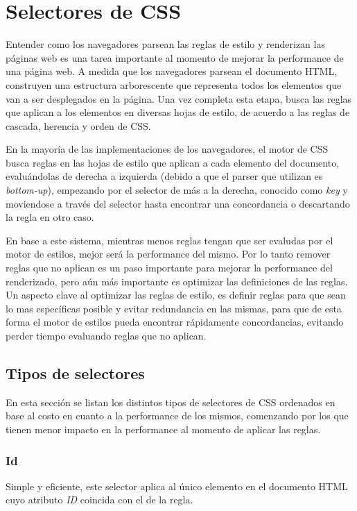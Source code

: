 
\chapter{Selectores de CSS}
Entender como los navegadores parsean las reglas de estilo y renderizan las páginas web es una tarea importante al momento de mejorar la performance de una página web.
A medida que los navegadores parsean el documento HTML, construyen una estructura arborescente que representa todos los elementos que van a ser desplegados en la página.
Una vez completa esta etapa, busca las reglas que aplican a los elementos en diversas hojas de estilo, de acuerdo a las reglas de cascada, herencia y orden de CSS.

En la mayoría de las implementaciones de los navegadores, el motor de CSS busca reglas en las hojas de estilo que aplican a cada elemento del documento, evaluándolas de derecha a izquierda 
(debido a que el parser que utilizan es \emph{bottom-up}), empezando por el selector de más a la derecha, conocido como \emph{key} y
moviendose a través del selector hasta encontrar una concordancia o descartando la regla en otro caso.

En base a este sistema, mientras menos reglas tengan que ser evaludas por el motor de estilos, mejor será la performance del mismo. Por lo tanto remover reglas que no aplican es
un paso importante para mejorar la performance del renderizado, pero aún más importante es optimizar las definiciones de las reglas. Un aspecto clave al optimizar
las reglas de estilo, es definir reglas para que sean lo mas específicas posible y evitar redundancia en las mismas, para que de esta forma el motor de estilos pueda
encontrar rápidamente concordancias, evitando perder tiempo evaluando reglas que no aplican.

\section{Tipos de selectores}
En esta sección se listan los distintos tipos de selectores de CSS ordenados en base al costo en cuanto a la performance de los mismos, comenzando por los que tienen
menor impacto en la performance al momento de aplicar las reglas.

\subsection{Id}
Simple y eficiente, este selector aplica al único elemento en el documento HTML cuyo atributo \emph{ID} coincida con el de la regla.

